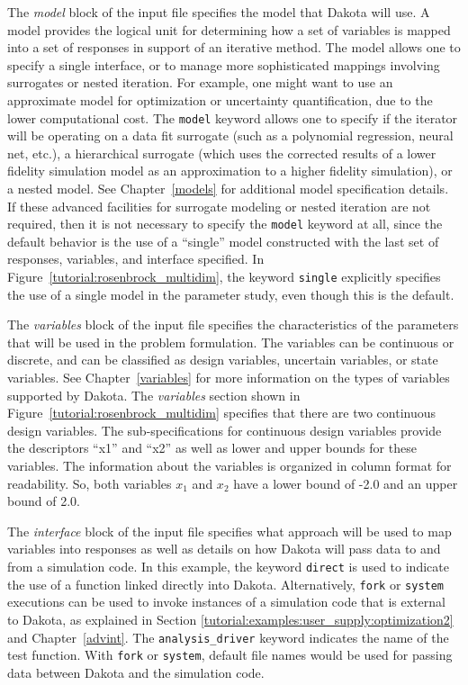 The \emph{model} block of the input file specifies the model that
Dakota will use. A model provides the logical unit for determining
how a set of variables is mapped into a set of responses in support of
an iterative method. The model allows one to specify a single
interface, or to manage more sophisticated mappings involving
surrogates or nested iteration. For example, one might want to use
an approximate model for optimization or uncertainty quantification,
due to the lower computational cost. The
\texttt{model} keyword allows one to specify if the iterator will be
operating on a data fit surrogate (such as a polynomial regression,
neural net, etc.), a hierarchical surrogate (which uses the corrected
results of a lower fidelity simulation model as an approximation to a
higher fidelity simulation), or a nested model. See
Chapter~\ref{models} for additional model specification details. If
these advanced facilities for surrogate modeling or nested iteration
are not required, then it is not necessary to specify the
\texttt{model} keyword at all, since the default behavior is the use
of a ``single'' model constructed with the last set of responses,
variables, and interface specified. In
Figure~\ref{tutorial:rosenbrock_multidim}, the keyword \texttt{single}
explicitly specifies the use of a single model in the parameter study,
even though this is the default.

The \emph{variables} block of the input file specifies the
characteristics of the parameters that will be used in the problem
formulation. The variables can be continuous or discrete, and can be
classified as design variables, uncertain variables, or state
variables. See Chapter~\ref{variables} for more information on the
types of variables supported by Dakota. The \emph{variables} section
shown in Figure~\ref{tutorial:rosenbrock_multidim} specifies that there are
two continuous design variables. The sub-specifications for
continuous design variables
provide the descriptors ``x1'' and ``x2'' as well as lower
and upper bounds for these variables. The information about the
variables is organized in column format for readability. So, both
variables $x_1$ and $x_2$ have a lower bound of -2.0 and an upper
bound of 2.0.

The \emph{interface} block of the input file specifies what approach
will be used to map variables into responses as well as details on how
Dakota will pass data to and from a simulation code.
In this example, the keyword \texttt{direct} is used to indicate the
use of a function linked directly into Dakota.
Alternatively, \texttt{fork} or \texttt{system} executions can be used
to invoke instances of a simulation code that is external to Dakota,
as explained in Section \ref{tutorial:examples:user_supply:optimization2} 
and Chapter~\ref{advint}.
The \texttt{analysis\_driver} keyword indicates the name of the test
function. With \texttt{fork} or \texttt{system}, default file names
would be used for passing data between Dakota and the simulation code.


